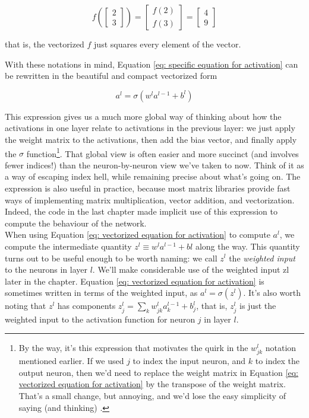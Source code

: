 \begin{equation}
f\left(
\begin{bmatrix}
2 \\
3 
\end{bmatrix}
\right)=
\begin{bmatrix}
f(2) \\
f(3) 
\end{bmatrix}
=
\begin{bmatrix}
4 \\
9 
\end{bmatrix}
\label{eq: function applied to vector}
\end{equation}

that is, the vectorized $f$ just squares every element of the vector.


With these notations in mind, Equation \ref{eq: specific equation for activation} can be rewritten in the beautiful and compact vectorized form

\begin{equation}
a^l=\sigma\left(w^l a^{l-1}+b^l\right)
\label{eq: vectorized equation for activation}
\end{equation}

This expression gives us a much more global way of thinking about how the activations in one layer relate to activations in the previous layer: we just apply the weight matrix to the activations, then add the bias vector, and finally apply the $\sigma$ function\footnote{By the way, it's this expression that motivates the quirk in the $w^l_{jk}$ notation mentioned earlier. If we used $j$ to index the input neuron, and $k$ to index the output neuron, then we'd need to replace the weight matrix in Equation \ref{eq: vectorized equation for activation} by the transpose of the weight matrix. That's a small change, but annoying, and we'd lose the easy simplicity of saying (and thinking) .}. That global view is often easier and more succinct (and involves fewer indices!) than the neuron-by-neuron view we've taken to now. Think of it as a way of escaping index hell, while remaining precise about what's going on. The expression is also useful in practice, because most matrix libraries provide fast ways of implementing matrix multiplication, vector addition, and vectorization. Indeed, the code in the last chapter made implicit use of this expression to compute the behaviour of the network.\\

When using Equation \ref{eq: vectorized equation for activation} to compute $a^l$, we compute the intermediate quantity $z^l\equiv w^l a^{l-1}+bl$ along the way. This quantity turns out to be useful enough to be worth naming: we call $z^l$ the \textit{weighted input} to the neurons in layer $l$. We'll make considerable use of the weighted input zl
 later in the chapter. Equation \ref{eq: vectorized equation for activation} is sometimes written in terms of the weighted input, as $a^l=\sigma(z^l)$. It's also worth noting that $z^l$ has components $z^l_j=\sum_k w^l_{jk} a^{l-1}_k+b^l_j$, that is, $z^l_j$ is just the weighted input to the activation function for neuron $j$ in layer $l$.\\

